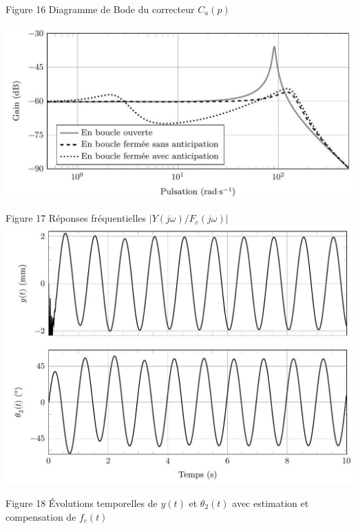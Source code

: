 \documentclass[10pt]{article}
\begin{document}
Figure 16 Diagramme de Bode du correcteur $C_{a}(p)$

\begin{center}
\includegraphics[max width=\textwidth]{2023_07_26_54f5e859400a10e656ddg-10(2)}
\end{center}

Figure 17 Réponses fréquentielles $\left|Y(j \omega) / F_{c}(j \omega)\right|$
\includegraphics[max width=\textwidth, center]{2023_07_26_54f5e859400a10e656ddg-10}

Figure 18 Évolutions temporelles de $y(t)$ et $\theta_{2}(t)$ avec estimation et compensation de $f_{c}(t)$
\end{document}

